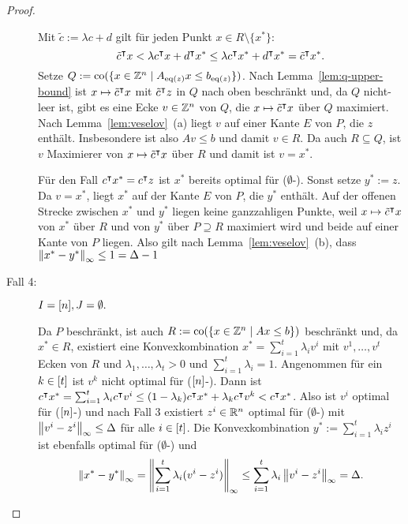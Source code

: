 \begin{proof}
\begin{description}
		Mit $\tilde{c}:=\lambda c+d$ gilt für jeden Punkt $x\in R\setminus\{x^*\}$:
		$$\tilde{c}^\intercal x < \lambda c^\intercal x + d^\intercal x^*\leq \lambda c^\intercal x^* + d^\intercal x^* = \tilde{c}^\intercal x^*.$$
		Setze $Q:=\operatorname{co}(\{x\in\mathbb{Z}^n \mid A_{\operatorname{eq}(z)}x \leq b_{\operatorname{eq}(z)} \})$.
		Nach Lemma~\ref{lem:q-upper-bound} ist $x\mapsto \tilde{c}^\intercal x$ mit $\tilde{c}^\intercal z$ in $Q$ nach oben beschränkt und, da $Q$ nicht-leer ist, gibt es eine Ecke $v\in\mathbb{Z}^n$ von $Q$, die $x\mapsto\tilde{c}^\intercal x$ über $Q$ maximiert.
		Nach Lemma~\ref{lem:veselov}~(a) liegt $v$ auf einer Kante $E$ von $P$, die $z$ enthält.
		Insbesondere ist also $Av\leq b$ und damit $v\in R$.
		Da auch $R \subseteq Q$, ist $v$ Maximierer von $x\mapsto \tilde{c}^\intercal x$ über $R$ und damit ist $v=x^*$.
		
		Für den Fall $c^\intercal x^*=c^\intercal z$ ist $x^*$ bereits optimal für ($\emptyset$-\MIPI).
		Sonst setze $y^*:=z$.
		Da $v=x^*$, liegt $x^*$ auf der Kante $E$ von $P$, die $y^*$ enthält.
		Auf der offenen Strecke zwischen $x^*$ und $y^*$ liegen keine ganzzahligen Punkte, weil $x\mapsto \tilde{c}^\intercal x$ von $x^*$ über $R$ und von $y^*$ über $P\supseteq R$ maximiert wird und beide auf einer Kante von $P$ liegen.
		Also gilt nach Lemma~\ref{lem:veselov}~(b), dass $\left\lVert x^*-y^*\right\rVert_\infty\leq 1 = \Delta -1 $
		
		\item[Fall 4:] $I=[n],J=\emptyset.$
		
		Da $P$ beschränkt, ist auch $R:=\operatorname{co}(\{x\in\mathbb{Z}^n \mid Ax\leq b\})$ beschränkt und, da $x^*\in R$, existiert eine Konvexkombination $x^* = \sum_{i=1}^t \lambda_i v^i$ mit $v^1,\dots,v^t$ Ecken von $R$ und $\lambda_1,\dots,\lambda_t>0$ und $\sum_{i=1}^t \lambda_i=1$.
		Angenommen für ein $k\in[t]$ ist $v^k$ nicht optimal für ($[n]$-\MIPI).
		Dann ist $c^\intercal x^*=\sum_{i=1}^t \lambda_i c^\intercal v^i \leq (1-\lambda_k)c^\intercal x^* + \lambda_k c^\intercal v^k < c^\intercal x^*$.
		Also ist $v^i$ optimal für ($[n]$-\MIPI) und nach Fall 3 existiert $z^i\in\mathbb{R}^n$ optimal für ($\emptyset$-\MIPI) mit $\left\lVert v^i-z^i\right\rVert_\infty\leq \Delta$ für alle $i\in[t]$.
		Die Konvexkombination $y^*:=\sum_{i=1}^t \lambda_i z^i$ ist ebenfalls optimal für ($\emptyset$-\MIPI) und
		$$\left\lVert x^*-y^*\right\rVert_\infty=\left\lVert\sum_{i=1}^t \lambda_i (v^i-z^i)\right\rVert_\infty\leq \sum_{i=1}^t \lambda_i \left\lVert v^i-z^i\right\rVert_\infty=\Delta.$$
	\end{description}
\end{proof}